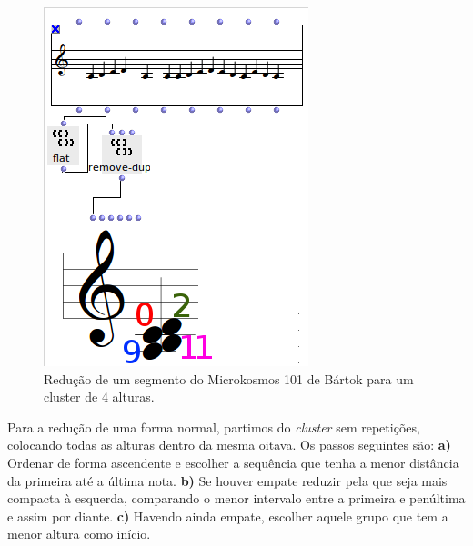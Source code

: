 \documentclass[
	12pt,				%
	openright,			%
	twoside,			%
	a4paper,			%
	english,			%
	french,				%
	spanish,			%
	brazil				%
	]{abntex2}
\begin{document}
\begin{apendicesenv}
\begin{figure}[h]
	\caption{\label{fig_grafico}Redução de um segmento do Microkosmos 101 de Bártok para um cluster de 4 alturas. }
	\begin{center}
	    \includegraphics[scale=0.7]{OM_settheory/reducao_acorde.png}
	\end{center}
\end{figure}

Para a redução de uma forma normal, partimos do \textit{cluster} sem repetições, colocando todas as alturas dentro da mesma oitava. Os passos seguintes são: 
\textbf{a)} Ordenar de forma ascendente e escolher a sequência que tenha a menor distância da primeira até a última nota.
\textbf{b)} Se houver empate reduzir pela que seja mais compacta à esquerda, comparando o menor intervalo entre a primeira e penúltima e assim por diante.
\textbf{c)} Havendo ainda empate, escolher aquele grupo que tem a menor altura como início. 


\end{apendicesenv}
\end{document}
